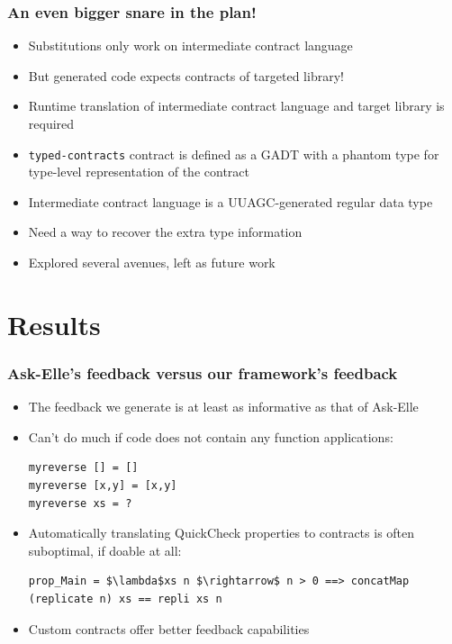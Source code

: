 \documentclass[]{beamer}
\begin{document}
\begin{frame}
\frametitle{An even bigger snare in the plan!}

\begin{itemize}
	\item Substitutions only work on intermediate contract language
	\item But generated code expects contracts of targeted library!
	\item Runtime translation of intermediate contract language and target library is required
	\item \texttt{typed-contracts} contract is defined as a GADT with a phantom type for type-level representation of the contract
	\item Intermediate contract language is a UUAGC-generated regular data type
	\item Need a way to recover the extra type information
	\item Explored several avenues, left as future work
\end{itemize}

\end{frame}

\section{Results}

\begin{frame}[fragile]
\frametitle{Ask-Elle's feedback versus our framework's feedback}

\begin{itemize}
	\item The feedback we generate is at least as informative as that of Ask-Elle
	\item Can't do much if code does not contain any function applications:

\begin{lstlisting}
myreverse [] = []
myreverse [x,y] = [x,y]
myreverse xs = ?	
\end{lstlisting}
	
	\item Automatically translating QuickCheck properties to contracts is often suboptimal, if doable at all:
	
\begin{lstlisting}[mathescape]
prop_Main = $\lambda$xs n $\rightarrow$ n > 0 ==> concatMap (replicate n) xs == repli xs n
\end{lstlisting}

	\item Custom contracts offer better feedback capabilities
\end{itemize}

\end{frame}
\end{document}

